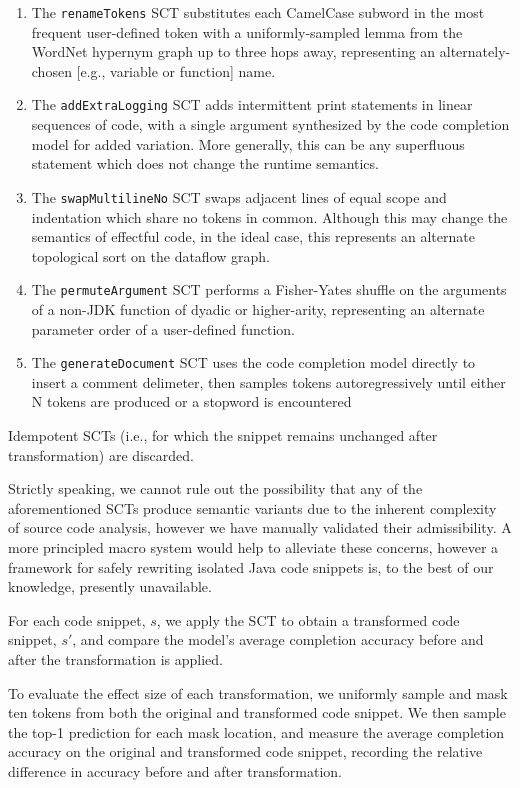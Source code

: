 \documentclass[sigconf,review,anonymous]{acmart}
\begin{document}
  \begin{enumerate}
    \item The \lstinline|renameTokens| SCT substitutes each CamelCase subword in the most frequent user-defined token with a uniformly-sampled lemma from the WordNet hypernym graph up to three hops away, representing an alternately-chosen [e.g., variable or function] name.
    \item The \lstinline|addExtraLogging| SCT adds intermittent print statements in linear sequences of code, with a single argument synthesized by the code completion model for added variation. More generally, this can be any superfluous statement which does not change the runtime semantics.
    \item The \lstinline|swapMultilineNo| SCT swaps adjacent lines of equal scope and indentation which share no tokens in common. Although this may change the semantics of effectful code, in the ideal case, this represents an alternate topological sort on the dataflow graph.
    \item The \lstinline|permuteArgument| SCT performs a Fisher-Yates shuffle on the arguments of a non-JDK function of dyadic or higher-arity, representing an alternate parameter order of a user-defined function.
    \item The \lstinline|generateDocument| SCT uses the code completion model directly to insert a comment delimeter, then samples tokens autoregressively until either N tokens are produced or a stopword is encountered
  \end{enumerate}

  Idempotent SCTs (i.e., for which the snippet remains unchanged after transformation) are discarded.

  Strictly speaking, we cannot rule out the possibility that any of the aforementioned SCTs produce semantic variants due to the inherent complexity of source code analysis, however we have manually validated their admissibility. A more principled macro system would help to alleviate these concerns, however a framework for safely rewriting isolated Java code snippets is, to the best of our knowledge, presently unavailable.

  For each code snippet, $s$, we apply the SCT to obtain a transformed code snippet, $s'$, and compare the model's average completion accuracy before and after the transformation is applied.

  To evaluate the effect size of each transformation, we uniformly sample and mask ten tokens from both the original and transformed code snippet. We then sample the top-1 prediction for each mask location, and measure the average completion accuracy on the original and transformed code snippet, recording the relative difference in accuracy before and after transformation.
\end{document}
